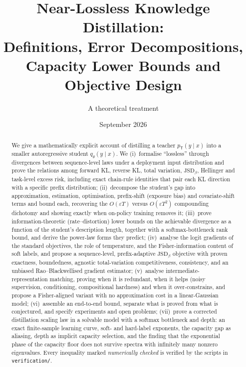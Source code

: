 \documentclass[11pt]{article}
\title{Near-Lossless Knowledge Distillation:\\
Definitions, Error Decompositions, Capacity Lower Bounds and Objective Design}
\author{A theoretical treatment}
\date{September 2026}
\theoremstyle{plain}
\theoremstyle{definition}
\theoremstyle{remark}
\newcommand{\TT}{\mathsf{T}}
\newcommand{\JSD}{\mathrm{JSD}}
\newcommand{\eps}{\varepsilon}
\begin{document}
\maketitle

\begin{abstract}
We give a mathematically explicit account of distilling a teacher $p_{\TT}(y\mid x)$ into a smaller
autoregressive student $q_\theta(y\mid x)$. We (i)~formalise ``lossless'' through divergences between
sequence-level laws under a deployment input distribution and prove the relations among forward KL,
reverse KL, total variation, $\JSD_\beta$, Hellinger and task-level excess risk, including exact
chain-rule identities that pair each KL direction with a specific prefix distribution;
(ii)~decompose the student's gap into approximation, estimation, optimisation, prefix-shift (exposure
bias) and covariate-shift terms and bound each, recovering the $O(\eps T)$ versus $O(\eps T^2)$
compounding dichotomy and showing exactly when on-policy training removes it; (iii)~prove
information-theoretic (rate--distortion) lower bounds on the achievable divergence as a function of
the student's description length, together with a softmax-bottleneck rank bound, and derive the
power-law forms they predict; (iv)~analyse the logit gradients of the standard objectives, the
role of temperature, and the Fisher-information content of soft labels, and propose a
sequence-level, prefix-adaptive $\JSD_\beta$ objective with proven exactness, boundedness,
agnostic total-variation competitiveness, consistency, and an unbiased Rao--Blackwellised gradient
estimator; (v)~analyse intermediate-representation matching, proving when it is redundant,
when it helps (noisy supervision, conditioning, compositional hardness) and when it over-constrains,
and propose a Fisher-aligned variant with no approximation cost in a linear-Gaussian model;
(vi)~assemble an end-to-end bound, separate what is proved from what is conjectured, and specify
experiments and open problems; (vii)~prove a corrected distillation scaling law in a solvable model with a
softmax bottleneck and depth: an exact finite-sample learning curve, soft- and hard-label exponents, the
capacity gap as aliasing, depth as implicit capacity selection, and the finding that the exponential phase
of the capacity floor does not survive spectra with infinitely many nonzero eigenvalues. Every inequality marked \emph{numerically checked} is verified by the
scripts in \texttt{verification/}.
\end{abstract}

\tableofcontents
\newpage











\appendix




\end{document}
